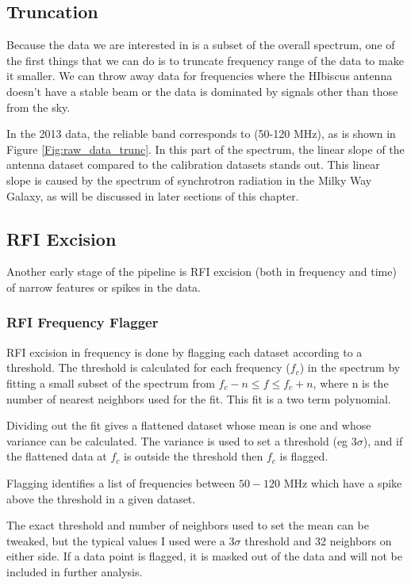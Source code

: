 \subsection{Truncation}

Because the data we are interested in is a subset of the overall spectrum, one of the first things that we can do is to truncate frequency range of the data to make it smaller. We can throw away data for frequencies where the HIbiscus antenna doesn't have a stable beam or the data is dominated by signals other than those from the sky. 

In the 2013 data, the reliable band corresponds to (50-120 MHz), as is shown in Figure \ref{Fig:raw_data_trunc}. In this part of the spectrum, the linear slope of the antenna dataset compared to the calibration datasets stands out. This linear slope is caused by the spectrum of synchrotron radiation in the Milky Way Galaxy, as will be discussed in later sections of this chapter. 

\subsection{RFI Excision}

Another early stage of the pipeline is RFI excision (both in frequency and time) of narrow features or spikes in the data. 

\subsubsection{RFI Frequency Flagger}

RFI excision in frequency is done by flagging each dataset according to a threshold. The threshold is calculated for each frequency ($f_c$) in the spectrum by fitting a small subset of the spectrum from $f_c-n \leq f \leq f_c + n$, where n is the number of nearest neighbors used for the fit. This fit is a two term polynomial. 

Dividing out the fit gives a flattened dataset whose mean is one and whose variance can be calculated. The variance is used to set a threshold (eg $3 \sigma$), and if the flattened data at $f_c$ is outside the threshold then $f_c$ is flagged. 

Flagging identifies a list of frequencies between $50-120$ MHz which have a spike above the threshold in a given dataset. 

The exact threshold and number of neighbors used to set the mean can be tweaked, but the typical values I used were a 3$\sigma$ threshold and 32 neighbors on either side. If a data point is flagged, it is masked out of the data and will not be included in further analysis.  

